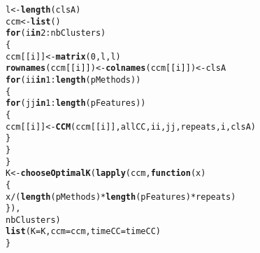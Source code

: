 \documentclass{article}\usepackage[]{graphicx}\usepackage[]{color}
\makeatletter
\newcommand{\hlnum}[1]{\textcolor[rgb]{0.686,0.059,0.569}{#1}}%
\newcommand{\hlopt}[1]{\textcolor[rgb]{0,0,0}{#1}}%
\newcommand{\hlstd}[1]{\textcolor[rgb]{0.345,0.345,0.345}{#1}}%
\newcommand{\hlkwa}[1]{\textcolor[rgb]{0.161,0.373,0.58}{\textbf{#1}}}%
\newcommand{\hlkwb}[1]{\textcolor[rgb]{0.69,0.353,0.396}{#1}}%
\newcommand{\hlkwc}[1]{\textcolor[rgb]{0.333,0.667,0.333}{#1}}%
\newcommand{\hlkwd}[1]{\textcolor[rgb]{0.737,0.353,0.396}{\textbf{#1}}}%
\newenvironment{kframe}{%
 \def\at@end@of@kframe{}%
 \ifinner\ifhmode%
  \def\at@end@of@kframe{\end{minipage}}%
  \begin{minipage}{\columnwidth}%
 \fi\fi%
 \def\FrameCommand##1{\hskip\@totalleftmargin \hskip-\fboxsep
 \colorbox{shadecolor}{##1}\hskip-\fboxsep
     \hskip-\linewidth \hskip-\@totalleftmargin \hskip\columnwidth}%
 \MakeFramed {\advance\hsize-\width
   \@totalleftmargin\z@ \linewidth\hsize
   \@setminipage}}%
 {\par\unskip\endMakeFramed%
 \at@end@of@kframe}
\newenvironment{knitrout}{}{} %
\makeatother
\begin{document}
\begin{knitrout}
\begin{kframe}
\begin{alltt}
    \hlstd{l} \hlkwb{<-} \hlkwd{length}\hlstd{(clsA)}
    \hlstd{ccm} \hlkwb{<-} \hlkwd{list}\hlstd{()}
    \hlkwa{for}\hlstd{(i} \hlkwa{in} \hlnum{2}\hlopt{:}\hlstd{nbClusters)}
    \hlstd{\{}
        \hlstd{ccm[[i]]} \hlkwb{<-} \hlkwd{matrix}\hlstd{(}\hlnum{0}\hlstd{,l,l)}
        \hlkwd{rownames}\hlstd{(ccm[[i]])} \hlkwb{<-} \hlkwd{colnames}\hlstd{(ccm[[i]])} \hlkwb{<-} \hlstd{clsA}
        \hlkwa{for}\hlstd{(ii} \hlkwa{in} \hlnum{1}\hlopt{:}\hlkwd{length}\hlstd{(pMethods))}
        \hlstd{\{}
            \hlkwa{for}\hlstd{(jj} \hlkwa{in} \hlnum{1}\hlopt{:}\hlkwd{length}\hlstd{(pFeatures))}
            \hlstd{\{}
                \hlstd{ccm[[i]]} \hlkwb{<-} \hlkwd{CCM}\hlstd{(ccm[[i]],allCC,ii,jj,repeats,i,clsA)}
            \hlstd{\}}
        \hlstd{\}}
    \hlstd{\}}
    \hlstd{K} \hlkwb{<-} \hlkwd{chooseOptimalK}\hlstd{(}\hlkwd{lapply}\hlstd{(ccm,}\hlkwa{function}\hlstd{(}\hlkwc{x}\hlstd{)}
    \hlstd{\{}
        \hlstd{x}\hlopt{/}\hlstd{(}\hlkwd{length}\hlstd{(pMethods)}\hlopt{*}\hlkwd{length}\hlstd{(pFeatures)}\hlopt{*}\hlstd{repeats)}
    \hlstd{\}),}
    \hlstd{nbClusters)}
    \hlkwd{list}\hlstd{(}\hlkwc{K}\hlstd{=K,}\hlkwc{ccm}\hlstd{=ccm,}\hlkwc{timeCC}\hlstd{=timeCC)}
\hlstd{\}}


\end{alltt}
\end{kframe}
\end{knitrout}
\end{document}
